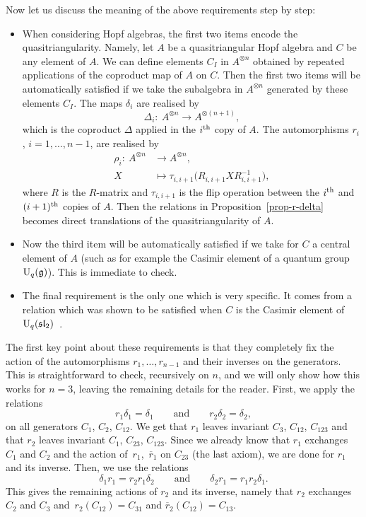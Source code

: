 \documentclass[10pt,a4paper]{amsart}
\numberwithin{equation}{section}
\theoremstyle{definition}
\newcommand{\rb}{\overline{r}}
\begin{document}
Now let us discuss the meaning of the above requirements step by step:
\begin{itemize}\itemsep=0pt
\item When considering Hopf algebras, the first two items encode the quasitriangularity. Namely, let $A$ be a quasitriangular Hopf algebra and $C$ be any element of $A$. We can define elements $C_I$ in $A^{\otimes n}$ obtained by repeated applications of the coproduct map of $A$ on $C$. Then the first two items will be automatically satisfied if we take the subalgebra in $A^{\otimes n}$ generated by these elements $C_I$. The maps $\delta_i$ are realised by
\begin{equation*}
\Delta_i\colon \ A^{\otimes n} \to A^{\otimes (n+1)},
\end{equation*}
which is the coproduct $\Delta$ applied in the $i^{\rm th}$ copy of $A$. The automorphisms $r_i$, $i=1,\dots,n-1$, are realised by
\begin{align*}
\rho_i\colon \ A^{\otimes n} &\to A^{\otimes n},\\
 X & \mapsto \tau_{i,i+1}\big( R_{i,i+1} X R_{i,i+1}^{-1}\big),
\end{align*}
where $R$ is the $R$-matrix and $\tau_{i,i+1}$ is the flip operation between the $i^{\rm th}$ and $(i+1)^{\rm th}$ copies of $A$. Then the relations in Proposition~\ref{prop-r-delta} becomes direct translations of the quasitriangularity of $A$.

\item Now the third item will be automatically satisfied if we take for $C$ a central element of $A$ (such as for example the Casimir element of a quantum group ${\rm U}_q(\mathfrak{g})$). This is immediate to check.

\item The final requirement is the only one which is very specific. It comes from a relation which was shown to be satisfied when $C$ is the Casimir element of ${\rm U}_q(\mathfrak{sl}_2)$~\cite{CGVZ}.
\end{itemize}

The first key point about these requirements is that they completely fix the action of the automorphisms $r_1,\dots,r_{n-1}$ and their inverses on the generators. This is straightforward to check, recursively on $n$, and we will only show how this works for $n=3$, leaving the remaining details for the reader. First, we apply the relations
\[
r_1\delta_1=\delta_1\qquad \text{and}\qquad r_2\delta_2=\delta_2 ,
\]
on all generators $C_1$, $C_2$, $C_{12}$. We get that $r_1$ leaves invariant $C_{3}$, $C_{12}$, $C_{123}$ and that $r_2$ leaves invariant $C_1$, $C_{23}$, $C_{123}$. Since we already know that $r_1$ exchanges $C_1$ and $C_2$ and the action of~$r_1$,~$\rb_1$ on $C_{23}$ (the last axiom), we are done for $r_1$ and its inverse. Then, we use the relations
\[
\delta_1r_1=r_2r_1\delta_2\qquad \text{and}\qquad \delta_2 r_1=r_1r_2\delta_1 .
\]
This gives the remaining actions of $r_2$ and its inverse, namely that $r_2$ exchanges $C_2$ and $C_3$ and~$r_2(C_{12})=C_{31}$ and $\rb_2(C_{12})=C_{13}$.
\end{document}
